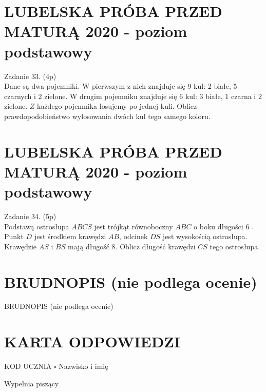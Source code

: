 \documentclass[10pt]{article}
\begin{document}
\section*{LUBELSKA PRÓBA PRZED MATURĄ 2020 - poziom podstawowy}
Zadanie 33. (4p)\\
Dane są dwa pojemniki. W pierwszym z nich znajduje się 9 kul: 2 białe, 5 czarnych i 2 zielone. W drugim pojemniku znajduje się 6 kul: 3 białe, 1 czarna i 2 zielone. \(Z\) każdego pojemnika losujemy po jednej kuli. Oblicz prawdopodobieństwo wylosowania dwóch kul tego samego koloru.

\section*{LUBELSKA PRÓBA PRZED MATURĄ 2020 - poziom podstawowy}
Zadanie 34. (5p)\\
Podstawą ostrosłupa \(A B C S\) jest trójkąt równoboczny \(A B C\) o boku długości 6 . Punkt \(D\) jest środkiem krawędzi \(A B\), odcinek \(D S\) jest wysokością ostrosłupa. Krawędzie \(A S\) i \(B S\) mają długość 8. Oblicz długość krawędzi \(C S\) tego ostrosłupa.

\section*{BRUDNOPIS (nie podlega ocenie)}
BRUDNOPIS (nie podlega ocenie)

\section*{KARTA ODPOWIEDZI}
KOD UCZNIA \(\square\) Nazwisko i imię \(\qquad\)

Wypelnia piszący
\end{document}
